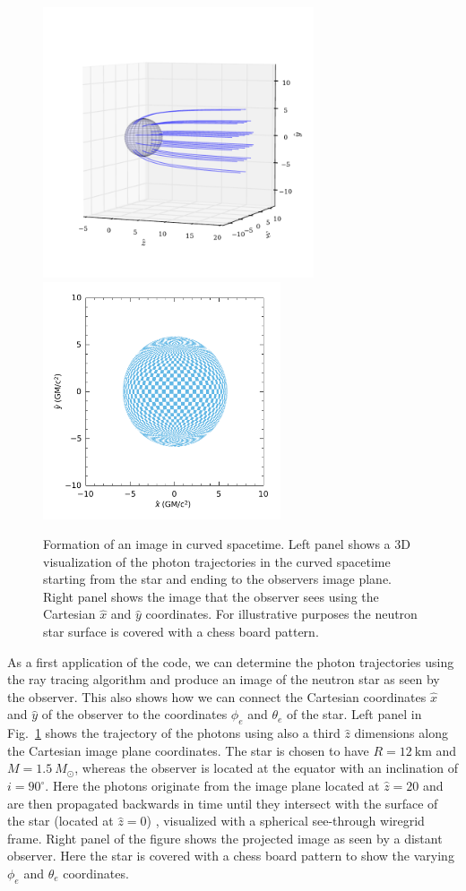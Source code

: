 \documentclass[iop, usenatbib]{emulateapj}
\newcommand{\Msun}{\ensuremath{M_{\odot}}}
\begin{document}
\begin{figure}
\centering
\includegraphics[clip, trim=0.0cm 0.5cm 0.0cm 2.0cm, width=8cm]{figs/fig10a.pdf}
\includegraphics[width=7cm]{figs/fig10b.pdf}
\caption{\label{fig:image}
  Formation of an image in curved spacetime.
  Left panel shows a 3D visualization of the photon trajectories in the curved spacetime starting from the star and ending to the observers image plane.
  Right panel shows the image that the observer sees using the Cartesian $\hat{x}$ and $\hat{y}$ coordinates.
  For illustrative purposes the neutron star surface is covered with a chess board pattern.
  }
\end{figure}


As a first application of the code, we can determine the photon trajectories using the ray tracing algorithm and produce an image of the neutron star as seen by the observer.
This also shows how we can connect the Cartesian coordinates $\hat{x}$ and $\hat{y}$ of the observer to the coordinates $\phi_e$ and $\theta_e$ of the star.
Left panel in Fig.~\ref{fig:image} shows the trajectory of the photons using also a third $\hat{z}$ dimensions along the Cartesian image plane coordinates.
The star is chosen to have $R=12~\mathrm{km}$ and $M=1.5~\Msun$, whereas the observer is located at the equator with an inclination of $i = 90^{\circ}$.
Here the photons originate from the image plane located at $\hat{z} = 20$ and are then propagated backwards in time until they intersect with the surface of the star (located at $\hat{z} = 0$) , visualized with a spherical see-through wiregrid frame.
Right panel of the figure shows the projected image as seen by a distant observer.
Here the star is covered with a chess board pattern to show the varying $\phi_e$ and $\theta_e$ coordinates.
\end{document}
